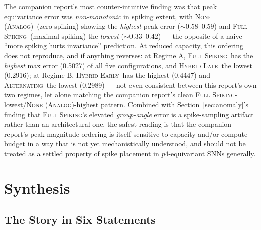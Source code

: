 \documentclass[11pt]{article}
\newcommand{\None}{\textsc{None (Analog)}}
\newcommand{\Alternating}{\textsc{Alternating}}
\newcommand{\FullSpiking}{\textsc{Full Spiking}}
\newcommand{\HybridLate}{\textsc{Hybrid Late}}
\newcommand{\HybridEarly}{\textsc{Hybrid Early}}
\begin{document}
The companion report's most counter-intuitive finding was that peak equivariance error was
\emph{non-monotonic} in spiking extent, with \None\ (zero spiking) showing the \emph{highest} peak
error ($\sim 0.58$--$0.59$) and \FullSpiking\ (maximal spiking) the \emph{lowest} ($\sim 0.33$--$0.42$)
--- the opposite of a naive ``more spiking hurts invariance'' prediction. At reduced capacity, this
ordering does not reproduce, and if anything reverses: at Regime A, \FullSpiking\ has the
\emph{highest} max error (0.5027) of all five configurations, and \HybridLate\ the lowest (0.2916); at
Regime B, \HybridEarly\ has the highest (0.4447) and \Alternating\ the lowest (0.2989) --- not even
consistent between this report's own two regimes, let alone matching the companion report's clean
\FullSpiking-lowest/\None-highest pattern. Combined with Section~\ref{sec:anomaly}'s finding that
\FullSpiking's elevated \emph{group-angle} error is a spike-sampling artifact rather than an
architectural one, the safest reading is that the companion report's peak-magnitude ordering is itself
sensitive to capacity and/or compute budget in a way that is not yet mechanistically understood, and
should not be treated as a settled property of spike placement in $p4$-equivariant SNNs generally.

\section{Synthesis}

\subsection{The Story in Six Statements}
\end{document}
